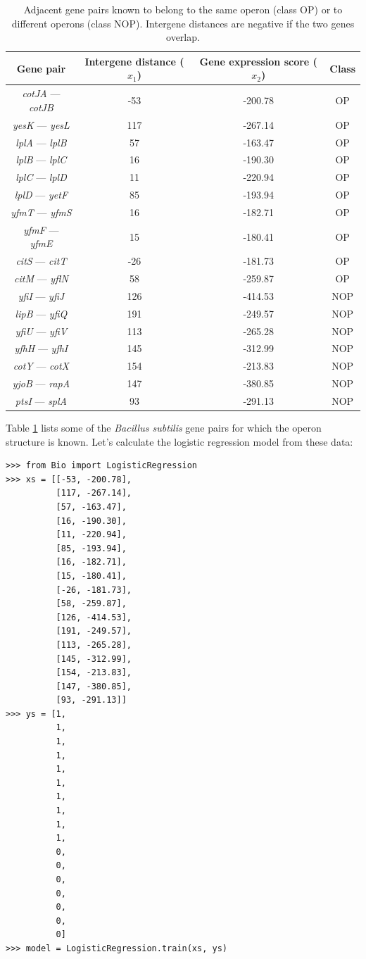 \documentclass{report}
\begin{document}
\begin{table}[h]
\begin{center}
\caption{Adjacent gene pairs known to belong to the same operon (class OP) or to different operons (class NOP). Intergene distances are negative if the two genes overlap.}
\begin{tabular}{|c|c|c|c|}
\hline
Gene pair & Intergene distance ($x_1$) & Gene expression score ($x_2$) & Class\\
\hline
{\it cotJA} --- {\it cotJB} & -53 & -200.78 & OP\\
{\it yesK} --- {\it yesL} & 117 & -267.14 & OP\\
{\it lplA} --- {\it lplB} & 57 & -163.47 & OP\\
{\it lplB} --- {\it lplC} & 16 & -190.30 & OP\\
{\it lplC} --- {\it lplD} & 11 & -220.94 & OP\\
{\it lplD} --- {\it yetF} & 85 & -193.94 & OP\\
{\it yfmT} --- {\it yfmS} & 16 & -182.71 & OP\\
{\it yfmF} --- {\it yfmE} & 15 & -180.41 & OP\\
{\it citS} --- {\it citT} & -26 & -181.73 & OP\\
{\it citM} --- {\it yflN} & 58 & -259.87 & OP\\
{\it yfiI} --- {\it yfiJ} & 126 & -414.53 & NOP\\
{\it lipB} --- {\it yfiQ} & 191 & -249.57 & NOP\\
{\it yfiU} --- {\it yfiV} & 113 & -265.28 & NOP\\
{\it yfhH} --- {\it yfhI} & 145 & -312.99 & NOP\\
{\it cotY} --- {\it cotX} & 154 & -213.83 & NOP\\
{\it yjoB} --- {\it rapA} & 147 & -380.85 & NOP\\
{\it ptsI} --- {\it splA} & 93 & -291.13 & NOP \\
\hline
\end{tabular}
\label{table:training}
\end{center}
\end{table}

Table \ref{table:training} lists some of the {\it Bacillus subtilis} gene pairs for which the operon structure is known.
Let's calculate the logistic regression model from these data:

\begin{verbatim}
>>> from Bio import LogisticRegression
>>> xs = [[-53, -200.78],
          [117, -267.14],
          [57, -163.47],
          [16, -190.30],
          [11, -220.94],
          [85, -193.94],
          [16, -182.71],
          [15, -180.41],
          [-26, -181.73],
          [58, -259.87],
          [126, -414.53],
          [191, -249.57],
          [113, -265.28],
          [145, -312.99],
          [154, -213.83],
          [147, -380.85],
          [93, -291.13]]
>>> ys = [1,
          1,
          1,
          1,
          1,
          1,
          1,
          1,
          1,
          1,
          0,
          0,
          0,
          0,
          0,
          0,
          0]
>>> model = LogisticRegression.train(xs, ys)
\end{verbatim}
\end{document}
